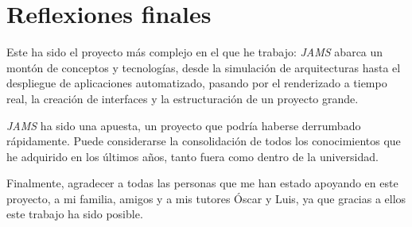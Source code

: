 \section{Reflexiones finales}\label{sec:reflexiones-finales}

Este ha sido el proyecto más complejo en el que he trabajo:
\textit{JAMS} abarca un montón de conceptos y tecnologías,
desde la simulación de arquitecturas hasta el despliegue de
aplicaciones automatizado, pasando por el renderizado a tiempo
real, la creación de interfaces y la estructuración de un
proyecto grande.

\noindent \textit{JAMS} ha sido una apuesta, un proyecto
que podría haberse derrumbado rápidamente.
Puede considerarse la consolidación de todos los conocimientos
que he adquirido en los últimos años, tanto fuera como dentro
de la universidad.

\noindent Finalmente, agradecer a todas las personas que me han
estado apoyando en este proyecto, a mi familia, amigos y a mis
tutores Óscar y Luis, ya que gracias a ellos este trabajo
ha sido posible.